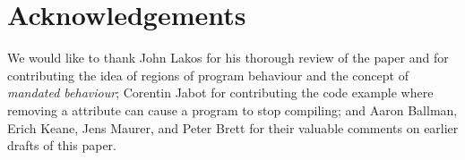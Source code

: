 \section*{Acknowledgements}
We would like to thank John Lakos for his thorough review of the paper and for contributing the idea of regions of program behaviour and the concept of \emph{mandated behaviour}; Corentin Jabot for contributing the code example where removing a \mbox{} attribute can cause a program to stop compiling; and Aaron Ballman, Erich Keane, Jens Maurer, and Peter Brett for their valuable comments on earlier drafts of this paper.

\renewcommand{\bibname}{References}



